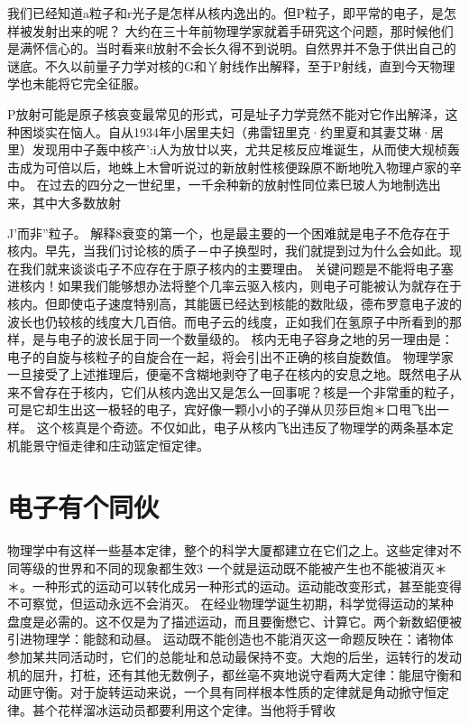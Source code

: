 我们已经知道a粒子和r光子是怎样从核内逸出的。但P粒子，即平常的电子，是怎样被发射出来的呢？
大约在三十年前物理学家就着手研究这个问题，那时候他们是满怀信心的。当时看来fl放射不会长久得不到说明。自然界并不急于供出自己的谜底。不久以前量子力学对核的G和丫射线作出解释，至于P射线，直到今天物理学也未能将它完全征服。

P放射可能是原子核哀变最常见的形式，可是址子力学竞然不能对它作出解泽，这种困埮实在恼人。自从1934年小居里夫妇（弗雷钮里克·约里夏和其妻艾琳·居里）发现用中子轰中核产':i人为放廿以夹，尤共足核反应堆诞生，从而使大规桢轰击成为可倍以后，地蛛上木曾听说过的新放射性核便跺原不断地吮入物理卢家的辛中。
在过去的四分之一世纪里，一千余种新的放射性同位素巳玻人为地制选出来，其中大多数放射{J'而非”粒子。
解释8衰变的第一个，也是最主要的一个困难就是电子不危存在于核内。早先，当我们讨论核的质子－中子换型时，我们就提到过为什么会如此。现在我们就来谈谈屯子不应存在于原子核内的主要理由。
关键问题是不能将电子塞进核内！如果我们能够想办法将整个几率云驱入核内，则电子可能被认为就存在于核内。但即使屯子速度特别高，其能匮已经达到核能的数阰级，德布罗意电子波的波长也仍较核的线度大几百倍。而电子云的线度，正如我们在氢原子中所看到的那样，是与电子的波长屈于同一个数量级的。
核内无电子容身之地的另一理由是：电子的自旋与核粒子的自旋合在一起，将会引出不正确的核自旋数值。
物理学家一旦接受了上述推理后，便毫不含糊地剥夺了电子在核内的安息之地。既然电子从来不曾存在于核内，它们从核内逸出又是怎么一回事呢？核是一个非常重的粒子，可是它却生出这一极轻的电子，宾好像一颗小小的子弹从贝莎巨炮＊口甩飞出一样。
这个核真是个奇迹。不仅如此，电子从核内飞出违反了物理学的两条基本定机能景守恒走律和庄动篮定恒定律。

\section{电子有个同伙}

物理学中有这样一些基本定律，整个的科学大厦都建立在它们之上。这些定律对不同等级的世界和不同的现象都生效3
一个就是运动既不能被产生也不能被消灭＊＊。一种形式的运动可以转化成另一种形式的运动。运动能改变形式，甚至能变得不可察觉，但运动永远不会消灭。
在经业物理学诞生初期，科学觉得运动的某种盘度是必需的。这不仅是为了描述运动，而且要衡懋它、计算它。两个新数蛁便被引进物理学：能懿和动昼。
运动既不能创造也不能消灭这一命题反映在：诸物体参加某共同活动时，它们的总能址和总动最保持不变。大炮的后坐，运转行的发动机的屈升，打桩，还有其他无数例子，都丝亳不爽地说守看两大定律：能屈守衡和动匪守衡。对于旋转运动来说，一个具有同样根本性质的定律就是角动掀守恒定律。甚个花样溜冰运动员都要利用这个定律。当他将手臂收

}
